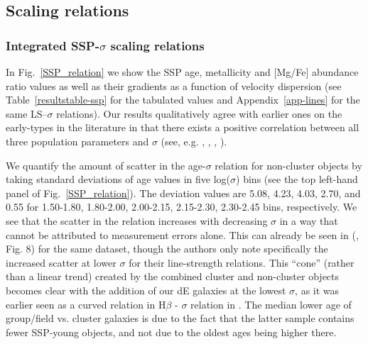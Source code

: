 \documentclass[useAMS,usenatbib]{mn2e}
\newcommand{\hb}{H$\beta$}
\newcommand{\sig}{$\sigma$}
\begin{document}
\subsection{Scaling relations}

\subsubsection{Integrated SSP-$\sigma$ scaling relations}

In Fig.~\ref{SSP_relation} we show the SSP age, metallicity and [Mg/Fe] abundance ratio values as well as their gradients as a function of velocity dispersion (see Table~\ref{resultstable-ssp} for the tabulated values and Appendix~\ref{app-lines} for the same LS--{\sig} relations). Our results qualitatively agree with earlier ones on the early-types in the literature in that there exists a positive correlation between all three population parameters and {\sig} (see, e.g. \citealt{graves:2009}, \citealt{kuntschner:2010}, \citealt{johansson:2012}, \citealt{conroy:2014}).


We quantify the amount of scatter in the age-{\sig} relation for non-cluster objects by taking standard deviations of age values in five log({\sig}) bins (see the top left-hand panel of Fig.~\ref{SSP_relation}). The deviation values are 5.08, 4.23, 4.03, 2.70, and 0.55 for 1.50-1.80, 1.80-2.00, 2.00-2.15, 2.15-2.30, 2.30-2.45 bins, respectively. We see that the scatter in the relation increases with decreasing {\sig} in a way that cannot be attributed to measurement errors alone. This can already be seen in \citeauthor{mcdermid:2015} (\citeyear{mcdermid:2015}, Fig. 8) for the same dataset, though the authors only note specifically the increased scatter at lower {\sig} for their line-strength relations. This ``cone'' (rather than a linear trend) created by the combined cluster and non-cluster objects becomes clear with the addition of our dE galaxies at the lowest {\sig}, as it was earlier seen as a curved relation in {\hb} - {\sig} relation in \cite{peletier:2007}. The median lower age of group/field vs. cluster galaxies is due to the fact that the latter sample contains fewer SSP-young objects, and not due to the oldest ages being higher there.
\end{document}
